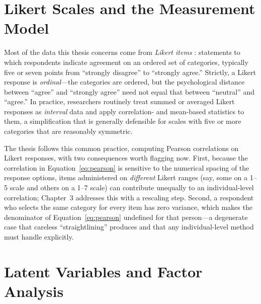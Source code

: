 \documentclass[doc,11pt,donotrepeattitle]{apa7}
\begin{document}
\section{Likert Scales and the Measurement Model}

Most of the data this thesis concerns come from \emph{Likert items}
\parencite{likert1932technique}: statements to which respondents indicate
agreement on an ordered set of categories, typically five or seven points from
``strongly disagree'' to ``strongly agree.'' Strictly, a Likert response is
\emph{ordinal}---the categories are ordered, but the psychological distance
between ``agree'' and ``strongly agree'' need not equal that between ``neutral''
and ``agree.'' In practice, researchers routinely treat summed or averaged
Likert responses as \emph{interval} data and apply correlation- and
mean-based statistics to them, a simplification that is generally defensible for
scales with five or more categories that are reasonably symmetric.

The thesis follows this common practice, computing Pearson correlations on
Likert responses, with two consequences worth flagging now. First, because the
correlation in Equation~\ref{eq:pearson} is sensitive to the numerical spacing
of the response options, items administered on \emph{different} Likert ranges
(say, some on a 1--5 scale and others on a 1--7 scale) can contribute unequally
to an individual-level correlation; Chapter~3 addresses this with a rescaling
step. Second, a respondent who selects the same category for every item has zero
variance, which makes the denominator of Equation~\ref{eq:pearson} undefined for
that person---a degenerate case that careless ``straightlining'' produces and
that any individual-level method must handle explicitly.

\section{Latent Variables and Factor Analysis}
\label{sec:efa}
\end{document}
